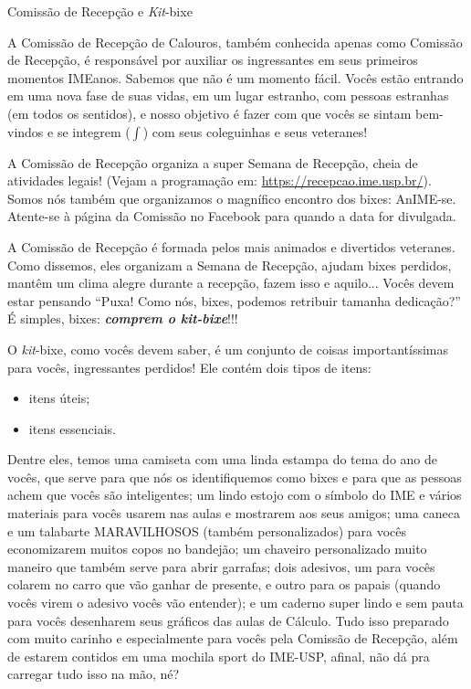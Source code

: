 \begin{secao}{Comissão de Recepção e \textit{Kit}-bixe}

A Comissão de Recepção de Calouros, também conhecida apenas como Comissão de
Recepção, é responsável por auxiliar os ingressantes em seus primeiros momentos
IMEanos. Sabemos que não é um momento fácil. Vocês estão entrando em uma nova fase
de suas vidas, em um lugar estranho, com pessoas estranhas (em todos os sentidos),
e nosso objetivo é fazer com que vocês se sintam bem-vindos e se integrem
($\int$) com seus coleguinhas e seus veteranes!

A Comissão de Recepção organiza a super Semana de Recepção, cheia de atividades
legais! (Vejam a programação em: \url{https://recepcao.ime.usp.br/}).
Somos nós também que organizamos o magnífico encontro dos bixes: AnIME-se.
Atente-se à página da Comissão no Facebook para quando a data for divulgada. %

A Comissão de Recepção é formada pelos mais animados e divertidos veteranes. Como
dissemos, eles organizam a Semana de Recepção, ajudam bixes perdidos, mantêm um clima
alegre durante a recepção, fazem isso e aquilo...
Vocês devem estar pensando ``Puxa! Como nós, bixes, podemos retribuir
tamanha dedicação?'' É simples, bixes: {\bf\em comprem o \textit{kit}-bixe}!!!

O \textit{kit}-bixe, como vocês devem saber, é um conjunto de coisas
importantíssimas para vocês, ingressantes perdidos! Ele contém dois tipos de
itens:
\begin{itemize}
\item itens úteis;
\item itens essenciais.
\end{itemize} %
Dentre eles, temos uma camiseta com uma linda estampa do tema do ano de vocês,
que serve para que nós os identifiquemos como bixes e para que as pessoas
achem que vocês são inteligentes; um lindo estojo com o símbolo do IME e vários 
materiais para vocês usarem nas aulas e mostrarem aos seus amigos; uma caneca e 
um talabarte MARAVILHOSOS (também personalizados) para vocês economizarem muitos 
copos no bandejão; um chaveiro personalizado muito maneiro que também serve para 
abrir garrafas; dois adesivos, um para vocês colarem no carro que vão ganhar de 
presente, e outro para os papais (quando vocês virem o adesivo vocês vão entender); 
e um caderno super lindo e sem pauta para vocês desenharem seus gráficos das aulas 
de Cálculo. Tudo isso preparado com muito carinho e especialmente para vocês pela 
Comissão de Recepção, além de estarem contidos em uma mochila sport do IME-USP, 
afinal, não dá pra carregar tudo isso na mão, né?


\end{secao}
